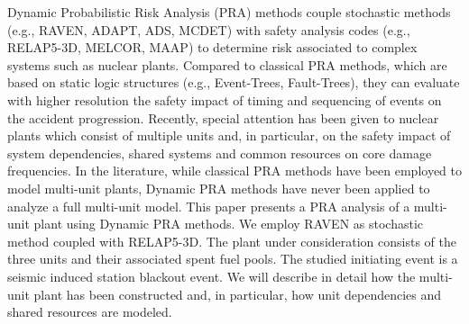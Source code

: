 Dynamic Probabilistic Risk Analysis (PRA) methods couple stochastic methods 
(e.g., RAVEN, ADAPT, ADS, MCDET) with safety analysis codes (e.g., RELAP5-3D, 
MELCOR, MAAP) to determine risk associated to complex systems such as nuclear 
plants. Compared to classical PRA methods, which are based on static logic 
structures (e.g., Event-Trees, Fault-Trees), they can evaluate with higher 
resolution the safety impact of timing and sequencing of events on the 
accident progression. Recently, special attention has been given to nuclear 
plants which consist of multiple units and, in particular, on the safety 
impact of system dependencies, shared systems and common resources on core 
damage frequencies. In the literature, while classical PRA methods have been 
employed to model multi-unit plants, Dynamic PRA methods have never been applied 
to analyze a full multi-unit model. This paper presents a PRA analysis of a 
multi-unit plant using Dynamic PRA methods. We employ RAVEN as stochastic 
method coupled with RELAP5-3D. The plant under consideration consists of the 
three units and their associated spent fuel pools. The studied initiating
event is a seismic induced station blackout event. We will describe in detail 
how the multi-unit plant has been constructed and, in particular, how unit 
dependencies and shared resources are modeled.